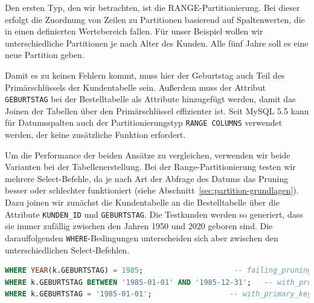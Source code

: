 Den ersten Typ, den wir betrachten, ist die RANGE-Partitionierung.
Bei dieser erfolgt die Zuordnung von Zeilen zu Partitionen basierend auf Spaltenwerten, die in einen definierten Wertebereich fallen.
Für unser Beispiel wollen wir unterschiedliche Partitionen je nach Alter des Kunden.
Alle fünf Jahre soll es eine neue Partition geben.

\vspace{-8pt}

\vspace{-5pt}

Damit es zu keinen Fehlern kommt, muss hier der Geburtstag auch Teil des Primärschlüssels der Kundentabelle sein.
Außerdem muss der Attribut \texttt{GEBURTSTAG} bei der Bestelltabelle als Attribute hinzugefügt werden, damit das Joinen der Tabellen über den Primärschlüssel effizienter ist.
Seit MySQL 5.5 kann für Datumsspalten auch der Partitionierungstyp \texttt{RANGE COLUMNS} verwendet werden, der keine zusätzliche Funktion erfordert.

Um die Performance der beiden Ansätze zu vergleichen, verwenden wir beide Varianten bei der Tabellenerstellung.
Bei der Range-Partitionierung testen wir mehrere Select-Befehle, da je nach Art der Abfrage des Datums das Pruning besser oder schlechter funktioniert (siehe Abschnitt~\ref{sec:partition-grundlagen}).
Dazu joinen wir zunächst die Kundentabelle an die Bestelltabelle über die Attribute \texttt{KUNDEN\_ID} und \texttt{GEBURTSTAG}.
Die Testkunden werden so generiert, dass sie immer zufällig zwischen den Jahren 1950 und 2020 geboren sind.
Die darauffolgenden \texttt{WHERE}-Bedingungen unterscheiden sich aber zwischen den unterschiedlichen Select-Befehlen.

\vspace{-5pt}
\begin{lstlisting}[language=SQL,caption=Unterschiedliche WHERE-Bedingungen,label={lst:different_where_conditions}]
WHERE YEAR(k.GEBURTSTAG) = 1985;		             -- failing_pruning.sql
WHERE k.GEBURTSTAG BETWEEN '1985-01-01' AND '1985-12-31'; 	-- with_pruning.sql
WHERE k.GEBURTSTAG = '1985-01-01';		            -- with_primary_key.sql
\end{lstlisting}
\vspace{-5pt}

